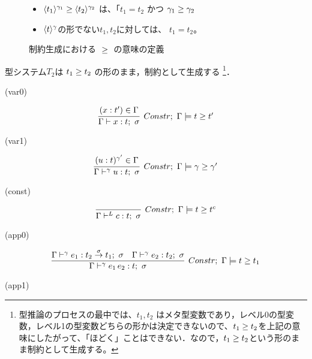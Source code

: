 \begin{figure}[H]
  \centering
  \begin{itemize}
  \item ${\langle{t_1}\rangle^{\gamma_1}} \ge {\langle{t_2}\rangle^{\gamma_2}}$
    は、「$t_1=t_2$ かつ ${\gamma_1} \ge {\gamma_2}$
  \item $\langle{t}\rangle^{\gamma}$の形でない$t_1,t_2$に対しては、
    $t_1 = t_2$。
  \end{itemize}

  \caption{制約生成における ${} \ge {}$ の意味の定義}
  \label{fig:typeinf_longer_def}
\end{figure}

型システム$T_2$は ${t_1} \ge {t_2}$ の形のまま，制約として生成する
\footnote{型推論のプロセスの最中では、$t_1, t_2$ はメタ型変数であり，レベル0の型変数，レベル1の型変数どちらの形かは決定できないので、${t_1} \ge {t_2}$を上記の意味にしたがって、「ほどく」ことはできない．なので，${t_1} \ge {t_2}$という形のまま制約として生成する。}．





(var0)

\[
  \infer[Constr;~\Gamma \models \longer{t}{t'}]
  {\Gamma \vdash x:t;~\sigma}
  {(x:t') \in \Gamma
  }
\]

(var1)

\[
  \infer[Constr;~\Gamma \models \longer{\gamma}{\gamma'}]
  {\Gamma \vdash^{\gamma} u:t;~\sigma}
  {(u:t)^{\gamma'} \in \Gamma
  }
\]

(const)

\[
  \infer[Constr;~\Gamma \models \longer{t}{t^c}]
  {\Gamma \vdash^{L} c:t;~\sigma}
  {}
\]

(app0)

\[
  \infer[Constr;~\Gamma \models \longer{t}{t_1}]
  {\Gamma \vdash^\gamma e_1 \, e_2 : t;~\sigma}
  {\Gamma \vdash^\gamma e_1 : \funT{t_2}{t_1}{\sigma};~\sigma
    &\Gamma \vdash^\gamma e_2 : t_2;~\sigma
  }
\]

(app1)

